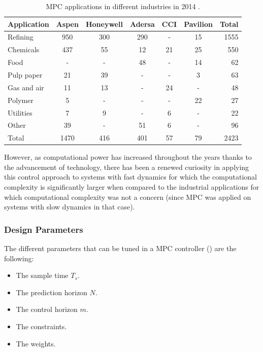 \documentclass{thesisreport}
\begin{document}
\newpage

\begin{table}[h]
\setlength{\tabcolsep}{15pt} %
\renewcommand{\arraystretch}{1} %
 \caption{MPC applications in different industries in 2014 \cite{Kozak2014}.}
 \label{table_MPC}
\begin{tabular}{l c c c c c r}
Application & Aspen & Honeywell & Adersa & CCI & Pavilion & Total \\
\hline
Refining & 950 & 300 & 290 & - & 15 & 1555 \\
Chemicals & 437 & 55 & 12 & 21 & 25 & 550 \\
Food & - & - & 48 & - & 14 & 62 \\
Pulp paper & 21 & 39 & - & - & 3 & 63 \\
Gas and air & 11 & 13 & - & 24 & - & 48 \\
Polymer & 5 & - & - & - & 22 & 27 \\
Utilities & 7 & 9 & - & 6 & - & 22 \\
Other & 39 & - & 51 & 6 & - & 96 \\
\hline 
\hline
Total & 1470 & 416 & 401 & 57 & 79 & 2423 \\
\end{tabular}
\end{table}

\noindent However, as computational power has increased throughout the years thanks to the advancement of technology, there has been a renewed curiosity in applying this control approach to systems with fast dynamics for which the computational complexity is significantly larger when compared to the industrial applications for which computational complexity was not a concern (since MPC was applied on systems with slow dynamics in that case).
 
\subsubsection{Design Parameters}
The different parameters that can be tuned in a MPC controller (\cite{MathWorks2018, MathWorks2018b, MathWorks2018c}) are the following:

\begin{itemize}
	\item The sample time $T_s$.
	\item The prediction horizon $N$.
	\item The control horizon $m$.
	\item The constraints.
	\item The weights.
\end{itemize}
\end{document}
